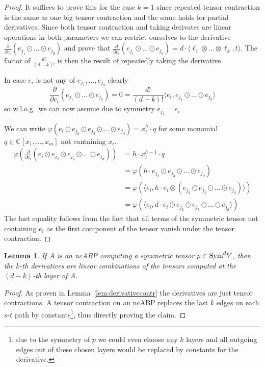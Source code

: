 \documentclass[10pt,a4paper]{article}
\numberwithin{equation}{section}
\newtheorem{lemma}[equation]{Lemma}
\theoremstyle{definition}
\newcommand{\Sym}{\textup{Sym}}
\newcommand{\IC}{\mathbb{C}}
\begin{document}
\begin{proof}
    It suffices to prove this for the case $k=1$ since repeated tensor contraction is the same as one big tensor contraction and the same holds for partial derivatives.
    Since both tensor contraction and taking derivates are linear operations in both parameters we can restrict ourselves to the derivative $\frac{\partial}{\partial e_i}(e_{j_1} \odot \dots \odot e_{j_d})$ and prove that $\frac{\partial}{\partial e_i}(e_{j_1} \odot \dots \odot e_{j_d}) = d \cdot \langle \ell_1 \otimes \dots \otimes \ell_k, t \rangle$.
    The factor of $\frac{d!}{(d-k)!}$ is then the result of repeatedly taking the derivative.

    In case $e_i$ is not any of $e_{j_1}, \dots, e_{j_d}$ clearly
    \[
        \frac{\partial}{\partial e_i}(e_{j_1} \odot \dots \odot e_{j_d}) = 0 = \frac{d!}{(d-k)!} \langle e_i, e_{j_1} \odot \dots \odot e_{j_d} \rangle
    \]
    so w.l.o.g.\ we can now assume due to symmetry $e_{j_1} = e_i$.

    We can write $\varphi\left(e_i \odot e_{j_2} \odot e_{j_3} \odot \dots \odot e_{j_d}\right) = x_i^h \cdot q$ for some monomial $q \in \IC[x_1, \dots,x_m]$ not containing $x_i$.
    \begin{align*}
        \varphi\left(\frac{\partial}{\partial e_i}\left(e_i \odot e_{j_2} \odot e_{j_3} \odot \dots \odot e_{j_d}\right)\right)
        &= h \cdot x_i^{h-1} \cdot q\\
        &= \varphi\left(h \cdot e_{j_2} \odot e_{j_3} \odot \dots \odot e_{j_d}\right)\\
        &= \varphi\left(\langle e_i, h \cdot e_i \otimes (e_{j_2} \odot e_{j_3} \odot \dots \odot e_{j_d})\rangle\right)\\
        &= \varphi\left(\langle e_i, d \cdot e_i \odot e_{j_2} \odot e_{j_3} \odot \dots \odot e_{j_d}\rangle\right)
    \end{align*}
    The last equality follows from the fact that all terms of the symmetric tensor not containing $e_i$ as the first component of the tensor vanish under the tensor contraction.
\end{proof}

\begin{lemma}
    \label{lem:derivativeabps}
    If $A$ is an ncABP computing a symmetric tensor $p \in \Sym^d V$, then the $k$-th derivatives are linear combinations of the tensors computed at the $(d-k)$-th layer of $A$.
\end{lemma}
\begin{proof}
    As proven in Lemma~\ref{lem:derivativecontr} the derivatives are just tensor contractions. A tensor contraction on an ncABP replaces the last $k$ edges on each $s$-$t$ path by constants\footnote{due to the symmetry of $p$ we could even choose any $k$ layers and all outgoing edges out of these chosen layers would be replaced by constants for the derivative.}, thus directly proving the claim.
\end{proof}
\end{document}
